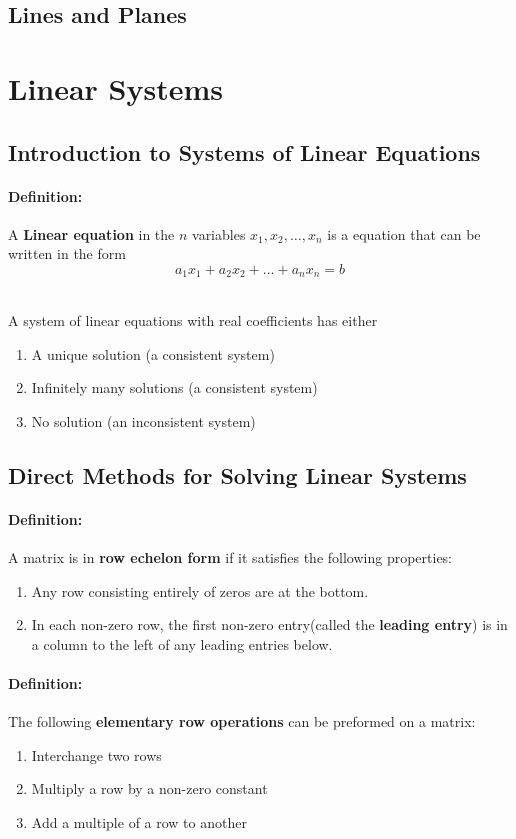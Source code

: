 \documentclass[12pt]{article}
\newenvironment{definition}{\paragraph{Definition: }}{\hfill}
\begin{document}
\subsection{Lines and Planes}

\newpage

\section{Linear Systems}

\subsection{Introduction to Systems of Linear Equations}
\begin{definition}
	A \textbf{Linear equation} in the $n$ variables $x_1, x_2, \dots, x_n$ is a equation that can be written in the form
	\[
	a_1 x_1 + a_2 x_2 + \dots + a_n x_n = b
	\]
	
	\hfill
	\\
	A system of linear equations with real coefficients has either
	\begin{enumerate}
		\item A unique solution (a consistent system)
		\item Infinitely many solutions (a consistent system)
		\item No solution (an inconsistent system)
	\end{enumerate}
\end{definition}

\newpage
\subsection{Direct Methods for Solving Linear Systems}

\begin{definition}
	A matrix is in \textbf{row echelon form} if it satisfies the following properties:
	\begin{enumerate}
		\item Any row consisting entirely of zeros are at the bottom.
		\item In each non-zero row, the first non-zero entry(called the \textbf{leading entry}) is in a column to the left of any leading entries below.
	\end{enumerate}
\end{definition}

\begin{definition}
	The following \textbf{elementary row operations} can be preformed on a matrix:
	\begin{enumerate}
		\item Interchange two rows
		\item Multiply a row by a non-zero constant
		\item Add a multiple of a row to another
	\end{enumerate}
\end{definition}
\end{document}
